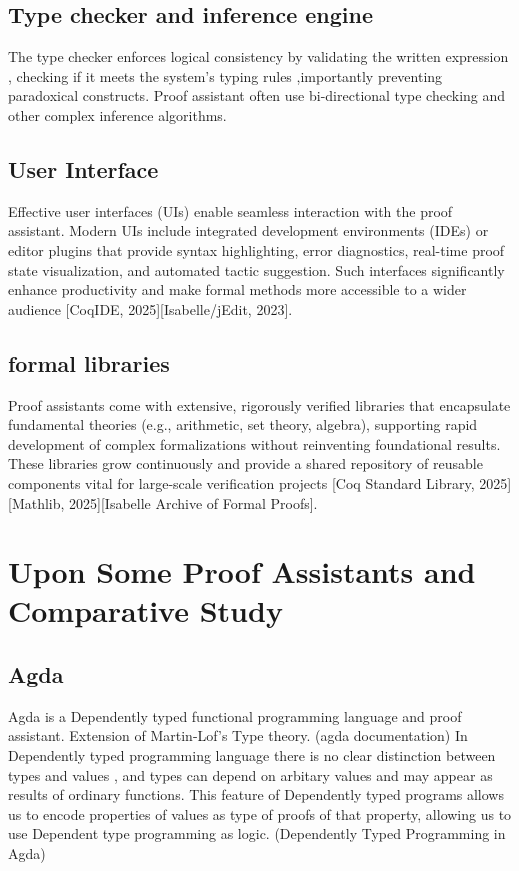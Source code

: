 \documentclass[12pt]{article}
\begin{document}
\subsection{Type checker and inference engine}
The type checker enforces logical consistency by validating the written expression , checking if it meets the system's typing
rules ,importantly preventing paradoxical constructs. Proof assistant often use bi-directional type checking and other 
complex inference algorithms.

\subsection{User Interface} 
Effective user interfaces (UIs) enable seamless interaction with the proof assistant. 
Modern UIs include integrated development environments (IDEs) or editor plugins that provide syntax highlighting, error diagnostics, real-time proof state visualization,
and automated tactic suggestion. Such interfaces significantly enhance productivity and make formal methods more accessible to a wider audience [CoqIDE, 2025][Isabelle/jEdit, 2023].
\subsection{formal libraries}
Proof assistants come with extensive, rigorously verified libraries that
encapsulate fundamental theories (e.g., arithmetic, set theory, algebra), supporting rapid development of
complex formalizations without reinventing foundational results.
These libraries grow continuously and provide a shared repository of reusable components vital for large-scale verification projects [Coq Standard Library, 2025][Mathlib, 2025][Isabelle Archive of Formal Proofs].
\section{Upon Some Proof Assistants and Comparative Study}
\subsection{ Agda}
Agda  is a Dependently typed functional programming language and proof assistant. Extension of Martin-Lof's Type theory. (agda documentation) 
In Dependently typed programming language there is no clear distinction between types and values , and types can depend on arbitary values and may appear as results of ordinary functions. 
This feature of Dependently typed programs allows us to encode properties of values as type of proofs of that property, allowing us to use Dependent type programming as logic.  (Dependently Typed Programming in Agda) 
\end{document}
